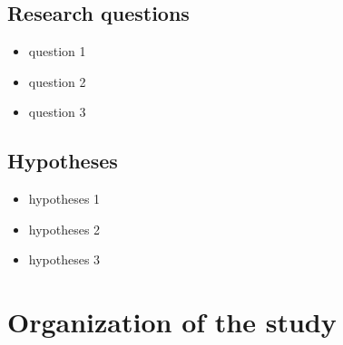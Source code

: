 \subsection{Research questions}
\justifying
\begin{itemize}
    \item question 1
    \item question 2
    \item question 3
\end{itemize}
\subsection{Hypotheses}
\justifying
\begin{itemize}
    \item hypotheses 1
    \item hypotheses 2
    \item hypotheses 3
\end{itemize}


\section{Organization of the study}
\justifying
\lipsum[1]


